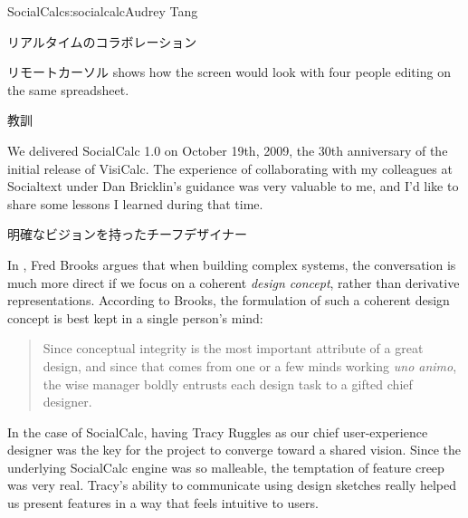 \begin{aosachapter}{SocialCalc}{s:socialcalc}{Audrey Tang}
\begin{aosasect1}{リアルタイムのコラボレーション}
\begin{aosasect2}{リモートカーソル}
 shows how the screen would look with four
people editing on the same spreadsheet.


\end{aosasect2}

\end{aosasect1}

\begin{aosasect1}{教訓}

We delivered SocialCalc 1.0 on October 19th, 2009, the 30th
anniversary of the initial release of VisiCalc.  The experience of
collaborating with my colleagues at Socialtext under Dan Bricklin's
guidance was very valuable to me, and I'd like to share some lessons
I learned during that time.

\begin{aosasect2}{明確なビジョンを持ったチーフデザイナー}

In \cite{bib:brooks:design}, Fred Brooks argues that when building
complex systems, the conversation is much more direct if we focus on a
coherent \emph{design concept}, rather than derivative
representations. According to Brooks, the formulation of such a
coherent design concept is best kept in a single person's mind:

\begin{quotation}

  \noindent
  Since conceptual integrity is the most important attribute of a
  great design, and since that comes from one or a few minds working
  \emph{uno animo}, the wise manager boldly entrusts each design task to a
  gifted chief designer.

\end{quotation}

In the case of SocialCalc, having Tracy Ruggles as our chief
user-experience designer was the key for the project to converge
toward a shared vision.  Since the underlying SocialCalc engine was
so malleable, the temptation of feature creep was very real. Tracy's
ability to communicate using design sketches really helped us
present features in a way that feels intuitive to users.


\end{aosasect2}
\end{aosasect1}
\end{aosachapter}
